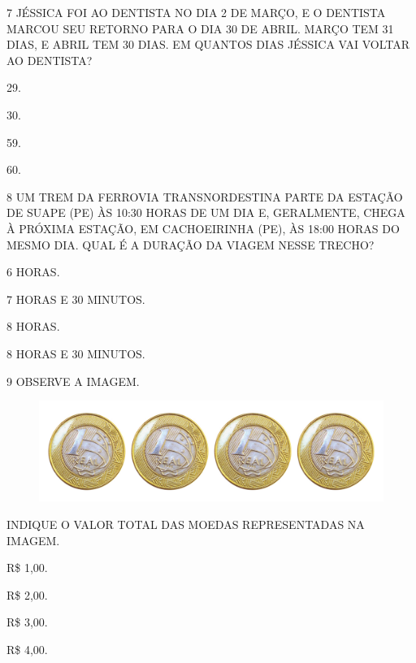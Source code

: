 \pagebreak
\num{7} JÉSSICA FOI AO DENTISTA NO DIA 2 DE MARÇO, E O DENTISTA MARCOU SEU
RETORNO PARA O DIA 30 DE ABRIL. MARÇO TEM 31 DIAS, E ABRIL TEM 30 DIAS. EM QUANTOS DIAS JÉSSICA VAI VOLTAR AO DENTISTA?

\begin{escolha}[itemsep=0pt]
\item 29.

\item 30.

\item 59.

\item 60.
\end{escolha}

\num{8} UM TREM DA FERROVIA TRANSNORDESTINA PARTE DA ESTAÇÃO DE SUAPE (PE) ÀS 10:30 HORAS DE UM DIA E, GERALMENTE, CHEGA À PRÓXIMA ESTAÇÃO, EM CACHOEIRINHA (PE), ÀS 18:00 HORAS DO MESMO DIA. QUAL É A DURAÇÃO DA VIAGEM NESSE TRECHO?

\begin{escolha}[itemsep=0pt]
\item 6 HORAS.

\item 7 HORAS E 30 MINUTOS.

\item 8 HORAS.

\item 8 HORAS E 30 MINUTOS.
\end{escolha}

\pagebreak
\num{9} OBSERVE A IMAGEM.


\begin{figure}[htpb!]
\centering
\includegraphics[width=.6\textwidth]{./media/SAEB_1ANO_MAT_FIGURA124.png}
\end{figure}

INDIQUE O VALOR TOTAL DAS MOEDAS REPRESENTADAS NA IMAGEM.

\begin{escolha}[itemsep=0pt]
\item R\$ 1,00.

\item R\$ 2,00.

\item R\$ 3,00.

\item R\$ 4,00.
\end{escolha}

